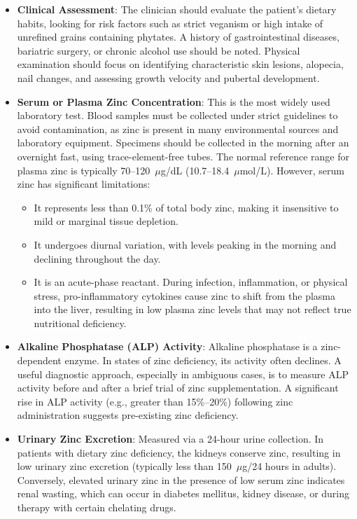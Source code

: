 \begin{itemize}
    \item \textbf{Clinical Assessment}: The clinician should evaluate the patient's dietary habits, looking for risk factors such as strict veganism or high intake of unrefined grains containing phytates. A history of gastrointestinal diseases, bariatric surgery, or chronic alcohol use should be noted. Physical examination should focus on identifying characteristic skin lesions, alopecia, nail changes, and assessing growth velocity and pubertal development.
    \item \textbf{Serum or Plasma Zinc Concentration}: This is the most widely used laboratory test. Blood samples must be collected under strict guidelines to avoid contamination, as zinc is present in many environmental sources and laboratory equipment. Specimens should be collected in the morning after an overnight fast, using trace-element-free tubes. The normal reference range for plasma zinc is typically 70--120~$\mu$g/dL (10.7--18.4~$\mu$mol/L). However, serum zinc has significant limitations:
        \begin{itemize}
            \item It represents less than 0.1\% of total body zinc, making it insensitive to mild or marginal tissue depletion.
            \item It undergoes diurnal variation, with levels peaking in the morning and declining throughout the day.
            \item It is an acute-phase reactant. During infection, inflammation, or physical stress, pro-inflammatory cytokines cause zinc to shift from the plasma into the liver, resulting in low plasma zinc levels that may not reflect true nutritional deficiency.
        \end{itemize}
    \item \textbf{Alkaline Phosphatase (ALP) Activity}: Alkaline phosphatase is a zinc-dependent enzyme. In states of zinc deficiency, its activity often declines. A useful diagnostic approach, especially in ambiguous cases, is to measure ALP activity before and after a brief trial of zinc supplementation. A significant rise in ALP activity (e.g., greater than 15\%--20\%) following zinc administration suggests pre-existing zinc deficiency.
    \item \textbf{Urinary Zinc Excretion}: Measured via a 24-hour urine collection. In patients with dietary zinc deficiency, the kidneys conserve zinc, resulting in low urinary zinc excretion (typically less than 150~$\mu$g/24 hours in adults). Conversely, elevated urinary zinc in the presence of low serum zinc indicates renal wasting, which can occur in diabetes mellitus, kidney disease, or during therapy with certain chelating drugs.

\end{itemize}
